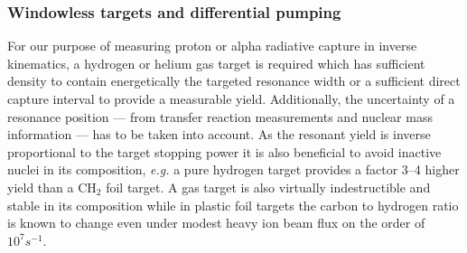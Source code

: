 \subsubsection{Windowless targets and differential pumping}


For our purpose of measuring proton or alpha radiative capture in inverse kinematics, a hydrogen or helium gas target is required which has sufficient density  to contain energetically the targeted resonance width or a sufficient direct capture interval to provide a measurable yield. Additionally, the uncertainty of a resonance position --- from transfer reaction measurements and nuclear mass information --- has to be taken into account. As the resonant yield is inverse proportional to the target stopping power it is also beneficial to avoid inactive nuclei in its composition, {\it e.g.} a pure hydrogen target provides a factor 3--4 higher yield than a CH$_2$ foil target.  A gas target is also virtually indestructible and stable in its composition while in plastic foil targets the carbon to hydrogen ratio is known to change even under modest heavy ion beam flux on the order of $10^7 \unit{s^{-1}}$.


